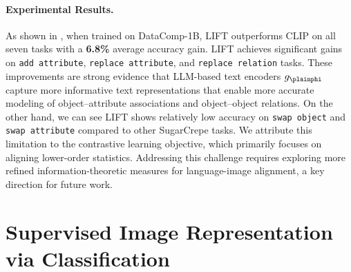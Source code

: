 \documentclass[../../book-main.tex]{subfiles}
\begin{document}
\paragraph{Experimental Results.}
As shown in , when trained on DataComp-1B, LIFT outperforms CLIP on all seven tasks with a \textbf{6.8\%} average accuracy gain.
LIFT achieves significant gains on \texttt{add attribute}, \texttt{replace attribute}, and \texttt{replace relation} tasks.
These improvements are strong evidence that LLM-based text encoders \(g_{\plainphi}\) capture more informative text representations that enable more accurate modeling of object--attribute associations and object--object relations.
On the other hand, we can see LIFT shows relatively low accuracy on \texttt{swap object} and \texttt{swap attribute} compared to other SugarCrepe tasks.
We attribute this limitation to the contrastive learning objective, which primarily focuses on aligning lower-order statistics.
Addressing this challenge requires exploring more refined information-theoretic measures for language-image alignment, a key direction for future work.

\begin{table}[t]
\centering
{}
\caption{\small\textbf{The performance of LIFT and CLIP on seven SugarCrepe tasks.}
We use an open-source CLIP implementation, OpenCLIP~\citep{ilharco_gabriel_2021_5143773}, and train both OpenCLIP and LIFT on the open-source text--image pair dataset DataComp~\citep{gadre2023datacompsearchgenerationmultimodal}.
We report accuracy for each task, with the best results bolded.}
\label{tab:Compositionality}
\end{table}

\section{Supervised Image Representation via Classification}\label{sec:image_classification}
\end{document}
